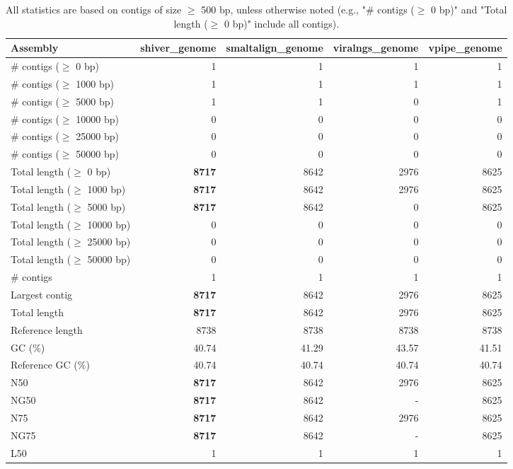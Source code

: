 \documentclass[12pt,a4paper]{article}
\begin{document}
\begin{table}[ht]
\begin{center}
\caption{All statistics are based on contigs of size $\geq$ 500 bp, unless otherwise noted (e.g., "\# contigs ($\geq$ 0 bp)" and "Total length ($\geq$ 0 bp)" include all contigs).}
\begin{tabular}{|l*{4}{|r}|}
\hline
Assembly & shiver\_genome & smaltalign\_genome & viralngs\_genome & vpipe\_genome \\ \hline
\# contigs ($\geq$ 0 bp) & 1 & 1 & 1 & 1 \\ \hline
\# contigs ($\geq$ 1000 bp) & 1 & 1 & 1 & 1 \\ \hline
\# contigs ($\geq$ 5000 bp) & 1 & 1 & 0 & 1 \\ \hline
\# contigs ($\geq$ 10000 bp) & 0 & 0 & 0 & 0 \\ \hline
\# contigs ($\geq$ 25000 bp) & 0 & 0 & 0 & 0 \\ \hline
\# contigs ($\geq$ 50000 bp) & 0 & 0 & 0 & 0 \\ \hline
Total length ($\geq$ 0 bp) & {\bf 8717} & 8642 & 2976 & 8625 \\ \hline
Total length ($\geq$ 1000 bp) & {\bf 8717} & 8642 & 2976 & 8625 \\ \hline
Total length ($\geq$ 5000 bp) & {\bf 8717} & 8642 & 0 & 8625 \\ \hline
Total length ($\geq$ 10000 bp) & 0 & 0 & 0 & 0 \\ \hline
Total length ($\geq$ 25000 bp) & 0 & 0 & 0 & 0 \\ \hline
Total length ($\geq$ 50000 bp) & 0 & 0 & 0 & 0 \\ \hline
\# contigs & 1 & 1 & 1 & 1 \\ \hline
Largest contig & {\bf 8717} & 8642 & 2976 & 8625 \\ \hline
Total length & {\bf 8717} & 8642 & 2976 & 8625 \\ \hline
Reference length & 8738 & 8738 & 8738 & 8738 \\ \hline
GC (\%) & 40.74 & 41.29 & 43.57 & 41.51 \\ \hline
Reference GC (\%) & 40.74 & 40.74 & 40.74 & 40.74 \\ \hline
N50 & {\bf 8717} & 8642 & 2976 & 8625 \\ \hline
NG50 & {\bf 8717} & 8642 & - & 8625 \\ \hline
N75 & {\bf 8717} & 8642 & 2976 & 8625 \\ \hline
NG75 & {\bf 8717} & 8642 & - & 8625 \\ \hline
L50 & 1 & 1 & 1 & 1 \\ \hline

\end{tabular}
\end{center}
\end{table}
\end{document}
